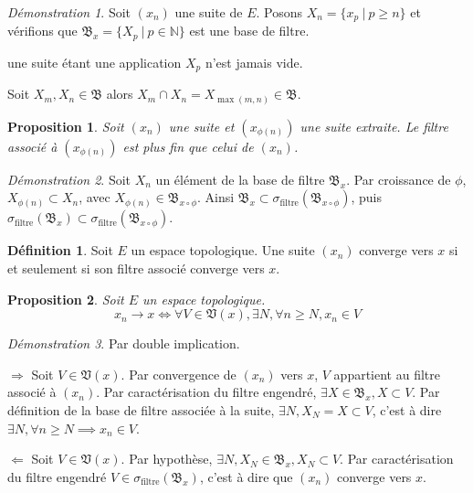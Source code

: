 \documentclass[a4paper, 11pt, french]{book}
\newenvironment{itemise}{\itemize}{\enditemize}
\theoremstyle{plain} %
\newtheorem{proposition}{Proposition}
\theoremstyle{definition} %
\newtheorem{definition}{Définition}
\theoremstyle{remark} %
\newtheorem*{demonstration}{Démonstration}
\newcommand{\1}{\mathds{1}}
\newcommand{\N}{\mathbb{N}}
\renewcommand{\frak}[1]{\mathfrak{#1}}
\newcommand\ens[2]{\{#1 \ |\ #2\}}
\newcommand\equivalence[3]{
	\begin{demonstration}
		#1
		\begin{itemise}
			\item[$\Longrightarrow$] #2
			\item[$\Longleftarrow$] #3
		\end{itemise}
	\end{demonstration}
}
\begin{document}
\begin{demonstration}
	Soit $(x_n)$ une suite de $E$.
	Posons $X_n=\ens{x_p}{p\geqslant n}$ et vérifions que $\frak{B}_x=\ens{X_p}{p\in\N}$ est une base de filtre.
	\begin{itemise}
		\item une suite étant une application $X_p$ n'est jamais vide.
		\item Soit $X_m, X_n\in\frak{B}$ alors $X_m\cap X_n=X_{\max(m, n)}\in\frak{B}$.
	\end{itemise}
\end{demonstration}

\begin{proposition}
	Soit $(x_n)$ une suite et $(x_{\phi(n)})$ une suite extraite.
	Le filtre associé à $(x_{\phi(n)})$ est plus fin que celui de $(x_n)$.
\end{proposition}

\begin{demonstration}
	Soit $X_n$ un élément de la base de filtre $\frak{B}_x$.
	Par croissance de $\phi$, $X_{\phi(n)}\subset X_n$, avec $X_{\phi(n)}\in\frak{B}_{x\circ\phi}$.
	Ainsi $\frak{B}_x\subset\sigma_\text{filtre}(\frak{B}_{x\circ\phi})$, puis $\sigma_\text{filtre}(\frak{B}_x)\subset\sigma_\text{filtre}(\frak{B}_{x\circ\phi})$.
\end{demonstration}

\begin{definition}
	Soit $E$ un espace topologique.
	Une suite $(x_n)$ converge vers $x$ si et seulement si son filtre associé converge vers $x$.
\end{definition}

\begin{proposition}
	Soit $E$ un espace topologique.
	$$
	x_n\rightarrow x
	\iff
	\forall V\in\frak{V}(x), \exists N, \forall n\geqslant N, x_n\in V
	$$
\end{proposition}

\equivalence{Par double implication.}{
	Soit $V\in\frak{V}(x)$.
	Par convergence de $(x_n)$ vers $x$, $V$ appartient au filtre associé à $(x_n)$.
	Par caractérisation du filtre engendré, $\exists X\in\frak{B}_x, X\subset V$.
	Par définition de la base de filtre associée à la suite, $\exists N, X_N=X\subset V$, c'est à dire $\exists N, \forall n\geqslant N\implies x_n\in V$.
}{
	Soit $V\in\frak{V}(x)$.
	Par hypothèse, $\exists N, X_N\in\frak{B}_x, X_N\subset V$.
	Par caractérisation du filtre engendré $V\in\sigma_\text{filtre}(\frak{B}_x)$, c'est à dire que $(x_n)$ converge vers $x$.	
}
\end{document}
